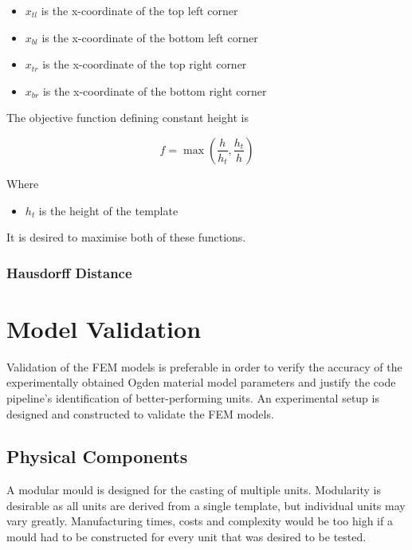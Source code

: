 \begin{itemize}
	\item $x_{tl}$ is the x-coordinate of the top left corner
	\item $x_{bl}$ is the x-coordinate of the bottom left corner
	\item $x_{tr}$ is the x-coordinate of the top right corner
	\item $x_{br}$ is the x-coordinate of the bottom right corner
\end{itemize}

The objective function defining constant height is

\begin{equation}
	f=\max\left (\frac{h}{h_{t}},\frac{h_{t}}{h} \right )
\end{equation}

Where

\begin{itemize}
	\item $h_{t}$ is the height of the template
\end{itemize}

It is desired to maximise both of these functions.

\subsubsection{Hausdorff Distance}
\label{ssec:Hd}

\section{Model Validation}
\label{sec:MV}

Validation of the FEM models is preferable in order to verify the accuracy of the experimentally obtained Ogden material model parameters and justify the code pipeline's identification of better-performing units. An experimental setup is designed and constructed to validate the FEM models.

\subsection{Physical Components}
\label{ssec:pc}

A modular mould is designed for the casting of multiple units. Modularity is desirable as all units are derived from a single template, but individual units may vary greatly. Manufacturing times, costs and complexity would be too high if a mould had to be constructed for every unit that was desired to be tested.

